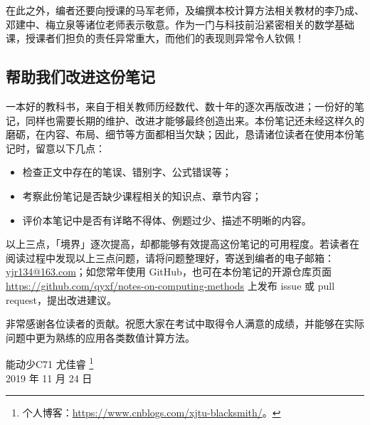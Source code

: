 在此之外，编者还要向授课的马军老师，及编撰本校计算方法相关教材的李乃成、邓建中、梅立泉等诸位老师表示敬意。作为一门与科技前沿紧密相关的数学基础课，授课者们担负的责任异常重大，而他们的表现则异常令人钦佩！

\subsection*{帮助我们改进这份笔记}
一本好的教科书，来自于相关教师历经数代、数十年的逐次再版改进；一份好的笔记，同样也需要长期的维护、改进才能够最终创造出来。本份笔记还未经这样久的磨砺，在内容、布局、细节等方面都相当欠缺；因此，恳请诸位读者在使用本份笔记时，留意以下几点：

\begin{itemize}\tl
    \item 检查正文中存在的笔误、错别字、公式错误等；
    \item 考察此份笔记是否缺少课程相关的知识点、章节内容；
    \item 评价本笔记中是否有详略不得体、例题过少、描述不明晰的内容。
\end{itemize}

以上三点，「境界」逐次提高，却都能够有效提高这份笔记的可用程度。若读者在阅读过程中发现以上三点问题，请将问题整理好，寄送到编者的电子邮箱：\url{yjr134@163.com}；如您常年使用 GitHub，也可在本份笔记的开源仓库页面 \url{https://github.com/qyxf/notes-on-computing-methods} 上发布 issue 或 pull request，提出改进建议。

非常感谢各位读者的贡献。祝愿大家在考试中取得令人满意的成绩，并能够在实际问题中更为熟练的应用各类数值计算方法。

\begin{flushright}
能动少C71 尤佳睿
\footnote{个人博客：\url{https://www.cnblogs.com/xjtu-blacksmith/}。}
\\2019 年 11 月 24 日
\end{flushright}

\thispagestyle{plain}
